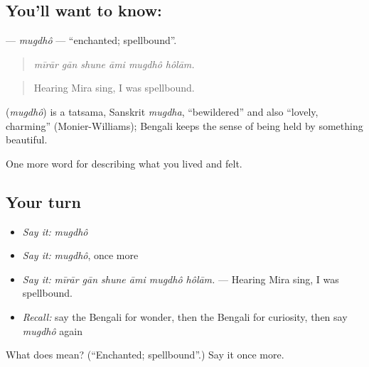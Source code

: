 \subsection*{You'll want to know: }
\textbf{} — \emph{mugdhô} — \textquotedblleft{}enchanted; spellbound\textquotedblright{}.

\begin{quote}
     
\end{quote}

\begin{quote}
\emph{mīrār gān shune āmi mugdhô hôlām.}
\end{quote}

\begin{quote}
Hearing Mira sing, I was spellbound.
\end{quote}

\begin{cousinweb}
\textbf{} (\emph{mugdhô}) is a tatsama, Sanskrit \emph{mugdha}, \textquotedblleft{}bewildered\textquotedblright{} and also \textquotedblleft{}lovely, charming\textquotedblright{} (Monier-Williams); Bengali keeps the sense of being held by something beautiful.
\end{cousinweb}

\begin{grammarlens}[title={What you've built}]
One more word for describing what you lived and felt.
\end{grammarlens}

\subsection*{Your turn}
\begin{itemize}
\raggedright
  \item \emph{Say it:} \emph{mugdhô}
  \item \emph{Say it:} \emph{mugdhô}, once more
  \item \emph{Say it:} \emph{mīrār gān shune āmi mugdhô hôlām.} — Hearing Mira sing, I was spellbound.
  \item \emph{Recall:} say the Bengali for wonder, then the Bengali for curiosity, then say \emph{mugdhô} again
\end{itemize}

\begin{tcolorbox}[breakable,colback=teal!4,colframe=teal!35!black,title={Before you move on}]
What does  mean? (\textquotedblleft{}Enchanted; spellbound\textquotedblright{}.) Say it once more.
\end{tcolorbox}
